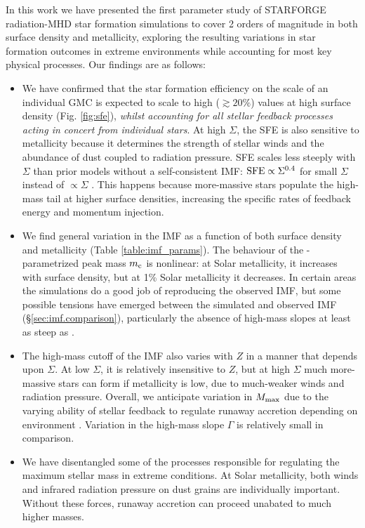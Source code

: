 \documentclass[apjl,twocolumn]{openjournal}
\begin{document}
In this work we have presented the first parameter study of \small{STARFORGE} radiation-MHD star formation simulations to cover 2 orders of magnitude in both surface density and metallicity, exploring the resulting variations in star formation outcomes in extreme environments while accounting for most key physical processes. Our findings are as follows:
\begin{itemize}
	\item We have confirmed that the star formation efficiency on the scale of an individual GMC is expected to scale to high ($\gtrsim 20\%$) values at high surface density (Fig. \ref{fig:sfe}), {\it whilst accounting for all stellar feedback processes acting in concert from individual stars}. At high $\Sigma$, the SFE is also sensitive to metallicity because it determines the strength of stellar winds and the abundance of dust coupled to radiation pressure. SFE scales less steeply with $\Sigma$ than prior models without a self-consistent IMF: $\rm SFE \propto \Sigma^{0.4}$ for small $\Sigma$ instead of $\propto \Sigma$ \citep[e.g.][]{fall:2010.sf.eff.vs.surfacedensity,grudic:2016.sfe}. This happens because more-massive stars populate the high-mass tail at higher surface densities, increasing the specific rates of feedback energy and momentum injection.
	\item We find general variation in the IMF as a function of both surface density and metallicity (Table \ref{table:imf_params}). The behaviour of the \citet{chabrier_imf}-parametrized peak mass $m_{\rm c}$ is nonlinear: at Solar metallicity, it increases with surface density, but at 1\% Solar metallicity it decreases. In certain areas the simulations do a good job of reproducing the observed IMF, but some possible tensions have emerged between the simulated and observed IMF (\S\ref{sec:imf.comparison}), particularly the absence of high-mass slopes at least as steep as \citet{salpeter_slope}.
	\item The high-mass cutoff of the IMF also varies with $Z$ in a manner that depends upon $\Sigma$. At low $\Sigma$, it is relatively insensitive to $Z$, but at high $\Sigma$ much more-massive stars can form if metallicity is low, due to much-weaker winds and radiation pressure. Overall, we anticipate variation in $M_{\rm max}$ due to the varying ability of stellar feedback to regulate runaway accretion depending on environment \citep[e.g.][]{grudic:2023.does.god.play.dice}. Variation in the high-mass slope $\Gamma$ is relatively small in comparison.
	\item We have disentangled some of the processes responsible for regulating the maximum stellar mass in extreme conditions. At Solar metallicity, both winds and infrared radiation pressure on dust grains are individually important. Without these forces, runaway accretion can proceed unabated to much higher masses.

\end{itemize}
\end{document}
